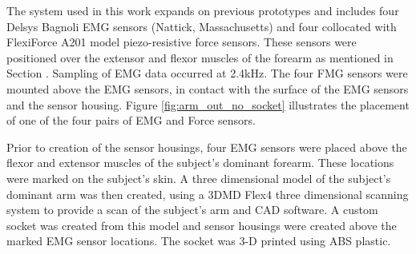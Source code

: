 \documentclass[twocolumn]{sagej}
\begin{document}
\begin{comment}
\begin{figure}[htbp]
\centering
\subfigure[]{\epsfig{figure=2sensor_socket.png,width=1.52in}\label{fig:twosensorsocket_worbla}}
\subfigure[]{\epsfig{figure=C:/Users/Joe/Dropbox/Grad_School/Resesarch/My_Papers/EMG-FMG-Journal_Article/Figures/two_sensor_socket_rear_view.png,width=1.7in}\label{fig:twosensorsocket_CAD}}
\caption{a)Second iteration of healthy limb socket (rear view). Sensor housing seen in white. b) Rapid Prototyped, printed, socket in ABS Plastic }
\end{figure}
\end{comment}
The system used in this work expands on previous prototypes and includes four Delsys Bagnoli EMG sensors (Nattick, Massachusetts) and four collocated with FlexiForce A201 model piezo-resistive force sensors.  These sensors were positioned over the extensor and flexor muscles of the forearm as mentioned in Section \textit{}.  Sampling of EMG data occurred at 2.4kHz.  The four FMG sensors were mounted above the EMG sensors, in contact with the surface of the EMG sensors and the sensor housing.  Figure \ref{fig:arm_out_no_socket} illustrates the placement of one of the four pairs of EMG and Force sensors.\par \noindent
Prior to creation of the sensor housings, four EMG sensors were placed above the flexor and extensor muscles of the subject's dominant forearm.  These locations were marked on the subject's skin.  A three dimensional model of the subject's dominant arm was then created, using a 3DMD Flex4 \cite{3dMD} three dimensional scanning system to provide a scan of the subject's arm and CAD software.  A custom socket was created from this model and sensor housings were created above the marked EMG sensor locations.  The socket was 3-D printed using ABS plastic.  \par \noindent%
\begin{comment}
\begin{figure}[htbp]
\centering
\subfigure[]{\epsfig{figure=arm_out_no_socket_crop_BW.png,width=2.5in}
\label{fig:arm_out_no_socket}}
\subfigure[]{\epsfig{figure=arm_socket_BW.png,width=2.5in}
 \label{fig:arm_socket}}
 \caption{a) Subject wearing SEMG and FMG collocated sensors b) Subject wearing simulated prosthetic socket and sensors}

\end{figure}
\end{comment}
\end{document}

